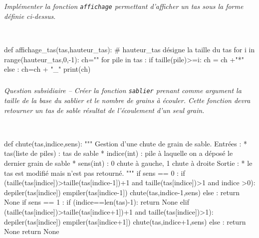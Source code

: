 \documentclass[10pt,fleqn]{article} %
\begin{document}
\subparagraph{}
\textit{Implémenter la fonction \texttt{affichage} permettant d'afficher un tas sous la forme définie ci-dessus.}
\ifprof
\begin{corrige}
~\\
\begin{python}
def affichage_tas(tas,hauteur_tas):
    # hauteur_tas désigne la taille du tas
    for i in range(hauteur_tas,0,-1):
        ch=""
        for pile in tas :
            if taille(pile)>=i:
                ch = ch +"*"
            else :
                ch=ch + "_"
        print(ch)
\end{python}
\end{corrige}
\else
\fi

\subparagraph{}
\textit{Question subsidiaire -- Créer la fonction \texttt{sablier} prenant comme argument la taille de la base du sablier et le nombre de grains à écouler. Cette fonction devra retourner un tas de sable résultat de l'écoulement d'un seul grain.}
\ifprof
\begin{corrige}
~\\
\begin{python}
def chute(tas,indice,sens):
    """
    Gestion d'une chute de grain de sable.
    Entrées : 
     * tas(liste de piles) : tas de sable
     * indice(int) : pile à laquelle on a déposé le dernier grain de sable
     * sens(int) : 0 chute à gauche, 1 chute à droite
    Sortie : 
     * le tas est modifié mais n'est pas retourné.
    """
    if sens == 0 :
        if (taille(tas[indice])>taille(tas[indice-1])+1 and taille(tas[indice])>1 and indice >0):
            depiler(tas[indice])
            empiler(tas[indice-1])
            chute(tas,indice-1,sens)
        else :
            return None
    if sens == 1 :
        if (indice==len(tas)-1):
            return None
        elif (taille(tas[indice])>taille(tas[indice+1])+1 and taille(tas[indice])>1):
            depiler(tas[indice])
            empiler(tas[indice+1])
            chute(tas,indice+1,sens)
        else :
            return None
    return None
\end{python}
\end{corrige}
\else
\fi

%
\end{document}
